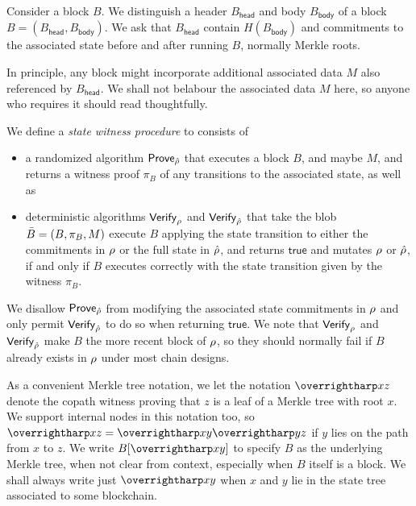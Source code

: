 Consider a block $B$.  We distinguish a header $B_{\mathsf{head}}$ and body $B_{\mathsf{body}}$ of a block $B = (B_{\mathsf{head}},B_{\mathsf{body}})$.  We ask that $B_{\mathsf{head}}$ contain $H(B_{\mathsf{body}})$ and commitments to the associated state before and after running $B$, normally Merkle roots.  

In principle, any block might incorporate additional associated data $M$ also referenced by $B_{\mathsf{head}}$.  We shall not belabour the associated data $M$ here, so anyone who requires it should read thoughtfully.

\begin{definition}\label{def:pob}
We define a {\em state witness procedure} to consists of
\begin{itemize}

\item a randomized algorithm $\mathsf{Prove}_{\hat{\rho}}$ that executes a block $B$, and maybe $M$, and returns a witness proof $\pi_B$ of any transitions to the associated state, as well as 
\item deterministic algorithms $\mathsf{Verify}_{\rho}$ and $\mathsf{Verify}_{\hat{\rho}}$ that take the blob $\bar{B} = (B,\pi_B,M)$ execute $B$ applying the state transition to either the commitments in $\rho$ or the full state in $\hat{\rho}$, and returns $\mathsf{true}$ and mutates $\rho$ or $\hat{\rho}$, if and only if $B$ executes correctly with the state transition given by the witness $\pi_B$. 
\end{itemize}
\end{definition}
We disallow $\mathsf{Prove}_{\hat{\rho}}$ from modifying the associated state commitments in $\rho$ and only permit $\mathsf{Verify}_{\hat{\rho}}$ to do so when returning $\mathsf{true}$.  We note that $\mathsf{Verify}_{\rho}$ and $\mathsf{Verify}_{\hat{\rho}}$ make $B$ the more recent block of $\rho$, so they should normally fail if $B$ already exists in $\rho$ under most chain designs. 

As a convenient Merkle tree notation, we let the notation $\vect{xz}$ denote the copath witness proving that $z$ is a leaf of a Merkle tree with root $x$.  We support internal nodes in this notation too, so $\vect{xz} = \vect{xy} \vect{yz}$ if $y$ lies on the path from $x$ to $z$.  We write $B[\vect{xy}]$ to specify $B$ as the underlying Merkle tree, when not clear from context, especially when $B$ itself is a block.  We shall always write just $\vect{xy}$ when $x$ and $y$ lie in the state tree associated to some blockchain.  

